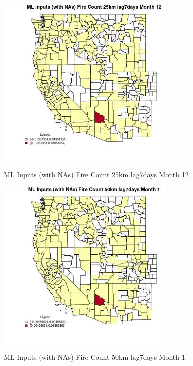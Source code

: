 \begin{figure} 
\centering  
\includegraphics[width=0.77\textwidth]{Code_Outputs/Report_ML_input_PM25_Step4_part_e_de_duplicated_aves_compiled_2019-05-21wNAs_CountyFire_Count_25km_lag7daysmedianMonth12.jpg} 
\caption{\label{fig:Report_ML_input_PM25_Step4_part_e_de_duplicated_aves_compiled_2019-05-21wNAsCountyFire_Count_25km_lag7daysmedianMonth12}ML Inputs (with NAs) Fire Count 25km lag7days Month 12} 
\end{figure} 
 

\begin{figure} 
\centering  
\includegraphics[width=0.77\textwidth]{Code_Outputs/Report_ML_input_PM25_Step4_part_e_de_duplicated_aves_compiled_2019-05-21wNAs_CountyFire_Count_50km_lag7daysmedianMonth1.jpg} 
\caption{\label{fig:Report_ML_input_PM25_Step4_part_e_de_duplicated_aves_compiled_2019-05-21wNAsCountyFire_Count_50km_lag7daysmedianMonth1}ML Inputs (with NAs) Fire Count 50km lag7days Month 1} 
\end{figure} 
 

